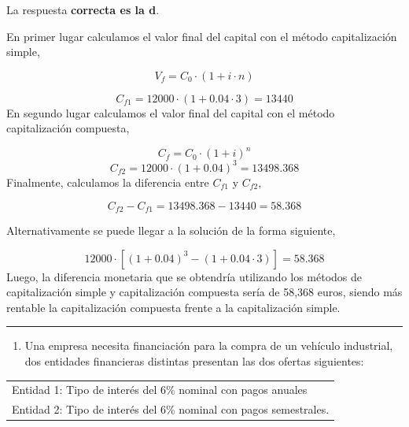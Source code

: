 \documentclass[
  letterpaper,
  DIV=11,
  numbers=noendperiod]{scrreprt}
\providecommand{\tightlist}{%
  \setlength{\itemsep}{0pt}\setlength{\parskip}{0pt}}\usepackage{longtable,booktabs,array}
\begin{document}
\begin{tcolorbox}[enhanced jigsaw, left=2mm, opacityback=0, colback=white, breakable, arc=.35mm, bottomrule=.15mm, rightrule=.15mm, toprule=.15mm, leftrule=.75mm, colframe=quarto-callout-tip-color-frame]
\begin{minipage}[t]{5.5mm}
\textcolor{quarto-callout-tip-color}{\faLightbulb}
\end{minipage}%
\begin{minipage}[t]{\textwidth - 5.5mm}

La respuesta \textbf{correcta es la d}.

En primer lugar calculamos el valor final del capital con el método
capitalización simple,

\[V_f=C_0\cdot\left(1+i\cdot n\right)\]

\[C_{f1}=12000\cdot\left(1+0.04 \cdot 3\right)=13440\] En segundo lugar
calculamos el valor final del capital con el método capitalización
compuesta,

\[C_{f}=C_0\cdot\left(1+i\right)^n\]
\[C_{f2}=12000\cdot\left(1+0.04\right)^3=13498.368\] Finalmente,
calculamos la diferencia entre \(C_{f1}\) y \(C_{f2}\),

\[C_{f2}-C_{f1}=13498.368-13440=58.368\]

Alternativamente se puede llegar a la solución de la forma siguiente,

\[12000\cdot\left[\left(1+0.04\right)^3-\left(1+0.04\cdot3\right)\right]=58.368\]
Luego, la diferencia monetaria que se obtendría utilizando los métodos
de capitalización simple y capitalización compuesta sería de 58,368
euros, siendo más rentable la capitalización compuesta frente a la
capitalización simple.

\end{minipage}%
\end{tcolorbox}

\begin{center}\rule{0.5\linewidth}{0.5pt}\end{center}

\begin{enumerate}
\def\labelenumi{\arabic{enumi}.}
\setcounter{enumi}{11}
\tightlist
\item
  Una empresa necesita financiación para la compra de un vehículo
  industrial, dos entidades financieras distintas presentan las dos
  ofertas siguientes:
\end{enumerate}

\begin{longtable}[]{@{}l@{}}
\toprule()
\endhead
Entidad 1: Tipo de interés del 6\% nominal con pagos anuales \\
Entidad 2: Tipo de interés del 6\% nominal con pagos semestrales. \\
\bottomrule()
\end{longtable}
\end{document}
